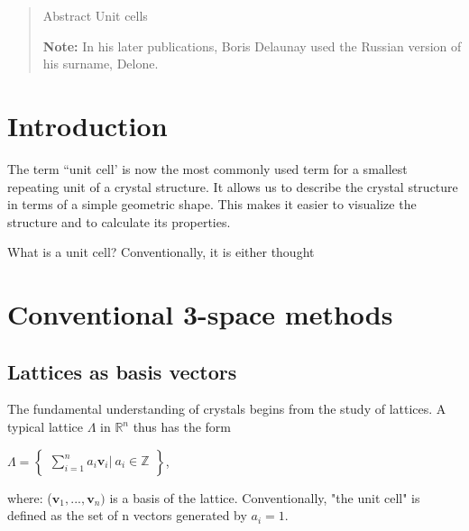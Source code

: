 \documentclass[preprint]{iucr}              %
\numberwithin{equation}{section}
\begin{document}
	\newcommand{\ci}[0]{$c_1$}
	\newcommand{\cii}[0]{$c_2$}
	\newcommand{\ciii}[0]{$c_3$}
	
	
	\begin{abstract}
		Abstract Unit cells
		
		{\bf Note:}  In his later publications, Boris Delaunay used the Russian version of his surname, Delone.\\
		
		
	\end{abstract}
	
	
	\section{Introduction}
	
	

	
	The term ``unit cell' is now the most commonly 
	used term for a smallest repeating unit 
	of a crystal structure.
	It allows us to describe the crystal structure 
	in terms of a simple geometric shape. 
	This makes it easier to visualize the structure 
	and to calculate its properties.
	
	What is a unit cell? Conventionally, it is either thought
	
	

\section{Conventional 3-space methods}

\subsection{Lattices as basis vectors}

The fundamental understanding of crystals begins from the
study of lattices. A typical lattice 
$\Lambda$  in 
$\mathbb{R}^{n}$ thus has the form

\begin{center}
	$\Lambda =  
\begin{Bmatrix}
	\sum_{i=1}^n a_i \mathbf{v}_i \bigg|~{a}_i \in \mathbb{Z}
\end{Bmatrix}
$,
\end{center}

\noindent
where: ($\mathbf{v}_1,...,\mathbf{v}_n)$ is a basis of the lattice. Conventionally, "the unit cell" is defined as the
set of n vectors generated by $a_i = 1$.
\end{document}
